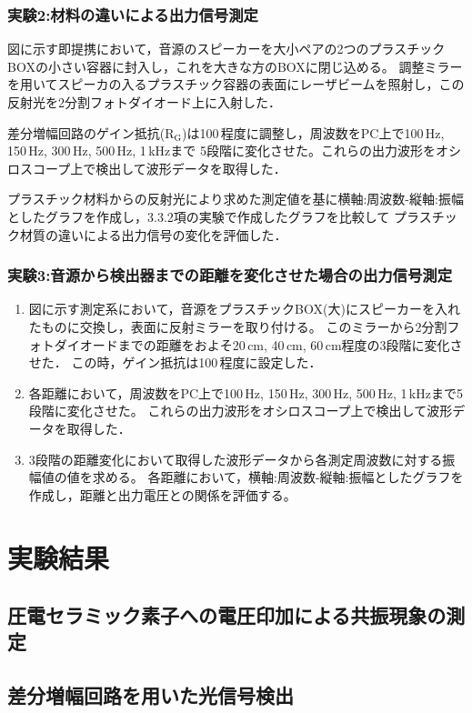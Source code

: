 \documentclass{ltjsarticle}
\begin{document}
			\subsubsection{実験2:材料の違いによる出力信号測定}
				図に示す即提携において，音源のスピーカーを大小ペアの2つのプラスチックBOXの小さい容器に封入し，これを大きな方のBOXに閉じ込める。
				調整ミラーを用いてスピーカの入るプラスチック容器の表面にレーザビームを照射し，この反射光を2分割フォトダイオード上に入射した．

				差分増幅回路のゲイン抵抗($\mathrm{R_G}$)は100\,\Omega 程度に調整し，周波数をPC上で100\,Hz, 150\,Hz, 300\,Hz, 500\,Hz, 1\,kHzまで
				5段階に変化させた。これらの出力波形をオシロスコープ上で検出して波形データを取得した．

				プラスチック材料からの反射光により求めた測定値を基に横軸:周波数-縦軸:振幅としたグラフを作成し，3.3.2項の実験で作成したグラフを比較して
				プラスチック材質の違いによる出力信号の変化を評価した．

			\subsubsection{実験3:音源から検出器までの距離を変化させた場合の出力信号測定}
				\begin{enumerate}
					\item 図に示す測定系において，音源をプラスチックBOX(大)にスピーカーを入れたものに交換し，表面に反射ミラーを取り付ける。
						このミラーから2分割フォトダイオードまでの距離をおよそ20\,cm, 40\,cm, 60\,cm程度の3段階に変化させた．
						この時，ゲイン抵抗は100\,\Omega 程度に設定した．
					\item 各距離において，周波数をPC上で100\,Hz, 150\,Hz, 300\,Hz, 500\,Hz, 1\,kHzまで5段階に変化させた。
						これらの出力波形をオシロスコープ上で検出して波形データを取得した．
					\item 3段階の距離変化において取得した波形データから各測定周波数に対する振幅値の値を求める。
						各距離において，横軸:周波数-縦軸:振幅としたグラフを作成し，距離と出力電圧との関係を評価する。
				\end{enumerate}
\section{実験結果}
	\subsection{圧電セラミック素子への電圧印加による共振現象の測定}
	\subsection{差分増幅回路を用いた光信号検出}
\end{document}
